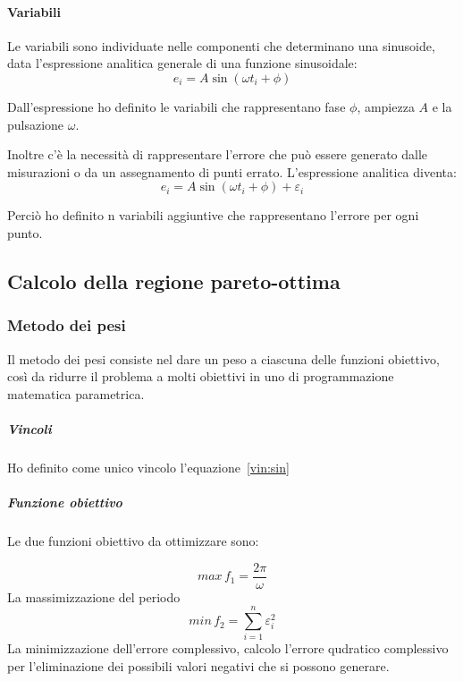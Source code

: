 \documentclass[a4paper,12pt]{report}
\begin{document}
\paragraph{Variabili}
Le variabili sono individuate nelle componenti che determinano una sinusoide, data l'espressione analitica generale di una funzione sinusoidale:
\begin{equation}
e_i = A\sin(\omega t_i + \phi)
\end{equation}

Dall'espressione ho definito le variabili che rappresentano fase $ \phi $, ampiezza $ A $  e la pulsazione $\omega$.

Inoltre c'è la necessità di rappresentare l'errore che può essere generato dalle misurazioni o da un assegnamento di punti errato. L'espressione analitica diventa:
\begin{equation}
\label{vin:sin}
e_i = A\sin(\omega t_i + \phi) + \varepsilon_i
\end{equation}

Perciò ho definito n variabili aggiuntive che rappresentano l'errore per ogni punto.
\subsection{Calcolo della regione pareto-ottima}

\subsubsection{Metodo dei pesi}
Il metodo dei pesi consiste nel dare un peso a ciascuna delle funzioni obiettivo, così da ridurre il problema a molti obiettivi in uno di programmazione matematica parametrica.

\subparagraph{Vincoli}
Ho definito come unico vincolo l'equazione~\eqref{vin:sin}

\subparagraph{Funzione obiettivo}
Le due funzioni obiettivo da ottimizzare sono:

\begin{equation}
\label{fo:periodo}
max \, f_1 = \frac{2\pi}{\omega}
\end{equation}
La massimizzazione del periodo
\begin{equation}
\label{fo:errore}
min \, f_2 = \sum_{i=1}^n \varepsilon_i^2
\end{equation}
La minimizzazione dell'errore complessivo, calcolo l'errore qudratico complessivo per l'eliminazione dei possibili valori negativi che si possono generare.
\end{document}
